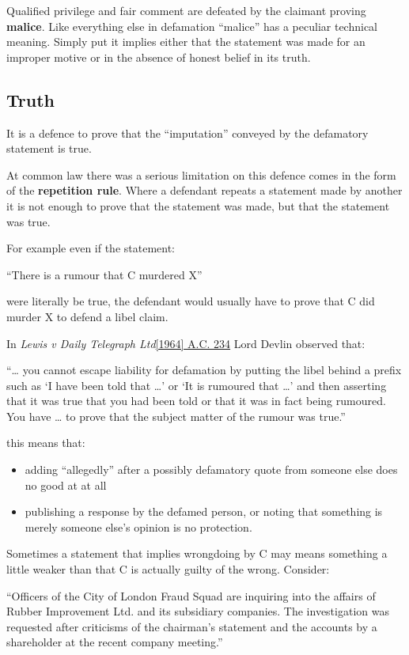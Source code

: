 \documentclass[]{article}
\begin{document}
{{Qualified privilege and fair comment are defeated by the claimant
proving }}{\textbf{malice}}{{. Like everything else in defamation
``malice'' has a peculiar technical meaning. Simply put it implies
either that the statement was made for an improper motive or in the
absence of honest belief in its truth.}}

\subsection{Truth}

It is a defence to prove that the ``imputation'' conveyed by the defamatory statement is true.

At common law there was a serious limitation on this defence comes in the form of the {\bf repetition rule}. Where a defendant repeats a statement
made by another it is not enough to prove that the statement was made, but that the statement was true. 

For example even if the statement:

``There is a rumour that C murdered X''

were literally be true, the defendant would usually have to prove that C did murder X to defend a libel claim.

In {\it Lewis v Daily Telegraph Ltd}\href{}{[1964] A.C. 234} Lord Devlin observed that:

``\ldots{} you cannot escape liability for defamation by putting the
libel behind a prefix such as `I have been told that \ldots{}' or `It is
rumoured that \ldots{}' and then asserting that it was true that you had
been told or that it was in fact being rumoured. You have \ldots{} to
prove that the subject matter of the rumour was true.''

this means that:

\begin{itemize}
\item
  adding ``allegedly'' after a possibly defamatory quote from someone
  else does no good at at all
\item
  publishing a response by the defamed person, or noting that something
  is merely someone else's opinion is no protection.
\end{itemize}

Sometimes a statement that implies wrongdoing by C may means something a little weaker than that C is actually guilty of the wrong. Consider:

``Officers of the City of London Fraud Squad are inquiring into the
affairs of Rubber Improvement Ltd. and its subsidiary companies. The
investigation was requested after criticisms of the chairman's statement
and the accounts by a shareholder at the recent company meeting.''
\end{document}
